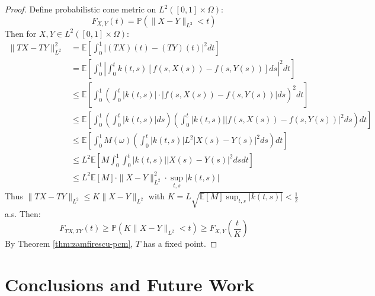 \documentclass{amsart}
\theoremstyle{definition}
\theoremstyle{remark}
\numberwithin{equation}{section}
\begin{document}
\begin{proof}
Define probabilistic cone metric on $L^2([0,1] \times \Omega)$:
\[
F_{X,Y}(t) = \mathbb{P}\left(\|X - Y\|_{L^2} < t\right)
\]
Then for $X,Y \in L^2([0,1] \times \Omega)$:
\begin{align*}
\|TX - TY\|_{L^2}^2 &= \mathbb{E}\left[\int_0^1 |(TX)(t) - (TY)(t)|^2 dt\right] \\
&= \mathbb{E}\left[\int_0^1 \left| \int_0^t k(t,s)[f(s,X(s)) - f(s,Y(s))]ds \right|^2 dt\right] \\
&\leq \mathbb{E}\left[\int_0^1 \left( \int_0^t |k(t,s)| \cdot |f(s,X(s)) - f(s,Y(s))| ds \right)^2 dt\right] \\
&\leq \mathbb{E}\left[\int_0^1 \left( \int_0^t |k(t,s)| ds \right) \left( \int_0^t |k(t,s)| |f(s,X(s)) - f(s,Y(s))|^2 ds \right) dt\right] \\
&\leq \mathbb{E}\left[\int_0^1 M(\omega) \left( \int_0^t |k(t,s)| L^2 |X(s) - Y(s)|^2 ds \right) dt\right] \\
&\leq L^2 \mathbb{E}\left[M \int_0^1 \int_0^t |k(t,s)| |X(s) - Y(s)|^2 ds dt\right] \\
&\leq L^2 \mathbb{E}[M] \cdot \|X - Y\|_{L^2}^2 \cdot \sup_{t,s} |k(t,s)|
\end{align*}
Thus $\|TX - TY\|_{L^2} \leq K \|X - Y\|_{L^2}$ with $K = L \sqrt{\mathbb{E}[M] \sup_{t,s} |k(t,s)|} < \frac{1}{2}$ a.s. Then:
\[
F_{TX,TY}(t) \geq \mathbb{P}\left(K \|X - Y\|_{L^2} < t\right) \geq F_{X,Y}\left(\frac{t}{K}\right)
\]
By Theorem \ref{thm:zamfirescu-pcm}, $T$ has a fixed point.
\end{proof}

\section{Conclusions and Future Work}
\end{document}
